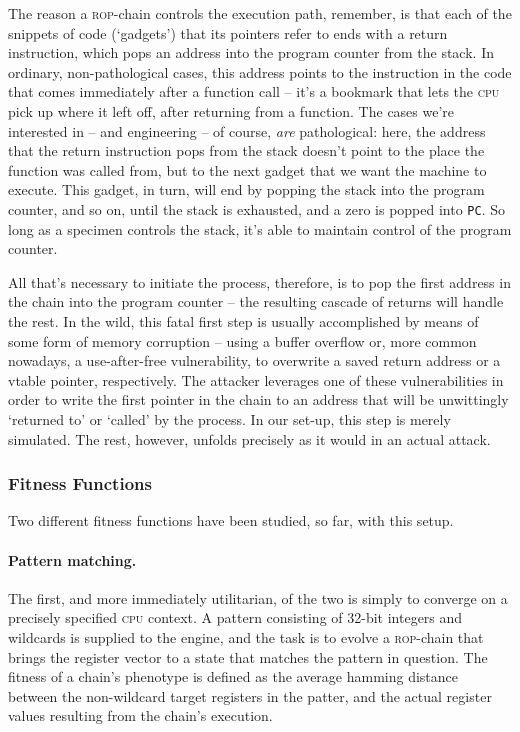 The reason a \textsc{rop}-chain controls the execution path,
remember, is that each of the snippets of code (`gadgets') that
its pointers refer to ends with a return instruction, which pops
an address into the program counter from the stack. In ordinary,
non-pathological cases, this address points to the instruction in
the code that comes immediately after a function call -- it's a
bookmark that lets the \textsc{cpu} pick up where it left off,
after returning from a function. The cases we're interested in --
and engineering -- of course, \emph{are} pathological: here, the
address that the return instruction pops from the stack doesn't
point to the place the function was called from, but to the next
gadget that we want the machine to execute. This gadget, in turn,
will end by popping the stack into the program counter, and so
on, until the stack is exhausted, and a zero is popped into
\texttt{PC}. So long as a specimen controls the stack, it's able
to maintain control of the program counter. 


All that's necessary to initiate the process, therefore, is to
pop the first address in the chain into the program counter --
the resulting cascade of returns will handle the rest. In the
wild, this fatal first step is usually accomplished by means of
some form of memory corruption -- using a buffer overflow or,
more common nowadays, a use-after-free vulnerability, to
overwrite a saved return address or a vtable pointer,
respectively.  The attacker leverages one of these
vulnerabilities in order to write the first pointer in the chain
to an address that will be unwittingly `returned to' or `called'
by the process. In our set-up, this step is merely simulated. The
rest, however, unfolds precisely as it would in an actual
attack.

\subsubsection{Fitness Functions}

Two different fitness functions have been studied, so far, with
this setup. 

\paragraph{Pattern matching.} The first, and more immediately
utilitarian, of the two is simply to converge on a precisely
specified \textsc{cpu} context. A pattern consisting of 32-bit
integers and wildcards is supplied to the engine, and the task is
to evolve a \textsc{rop}-chain that brings the register vector to
a state that matches the pattern in question. The fitness of a
chain's phenotype is defined as the average hamming distance
between the non-wildcard target registers in the patter, and the
actual register values resulting from the chain's execution. 

